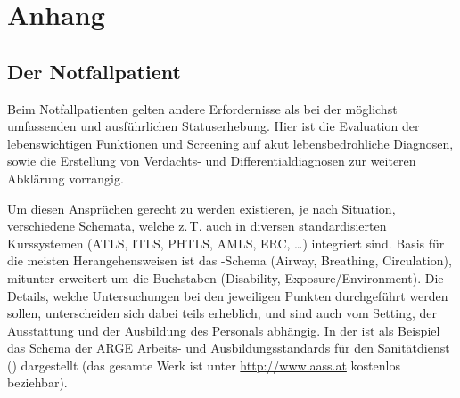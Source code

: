 \clearpage
\section{Anhang}

\subsection{Der Notfallpatient}

Beim Notfallpatienten gelten andere Erfordernisse als bei
der möglichst umfassenden und ausführlichen Statuserhebung.
Hier ist die Evaluation der lebenswichtigen Funktionen und
Screening auf akut lebensbedrohliche Diagnosen, sowie die
Erstellung von Verdachts- und Differentialdiagnosen zur
weiteren Abklärung vorrangig. 

Um diesen Ansprüchen gerecht zu werden existieren, je nach
Situation, verschiedene Schemata, welche z.\,T. auch in
diversen standardisierten Kurssystemen
(ATLS{\texttrademark}, ITLS{\texttrademark},
PHTLS{\texttrademark}, AMLS{\texttrademark},
ERC{\texttrademark}, \ldots) integriert sind. Basis für die
meisten Herangehensweisen ist das -Schema (Airway,
Breathing, Circulation), mitunter erweitert um die
Buchstaben  (Disability, Exposure/Environment). Die
Details, welche Untersuchungen bei den jeweiligen Punkten
durchgeführt werden sollen, unterscheiden sich dabei teils
erheblich, und sind auch vom Setting, der Ausstattung und
der Ausbildung des Personals abhängig.
In der 
ist als Beispiel das Schema der ARGE Arbeits- und
Ausbildungsstandards für den Sanitätdienst ({\ARGE})
dargestellt (das gesamte Werk ist unter \url{http://www.aass.at}
kostenlos beziehbar).


